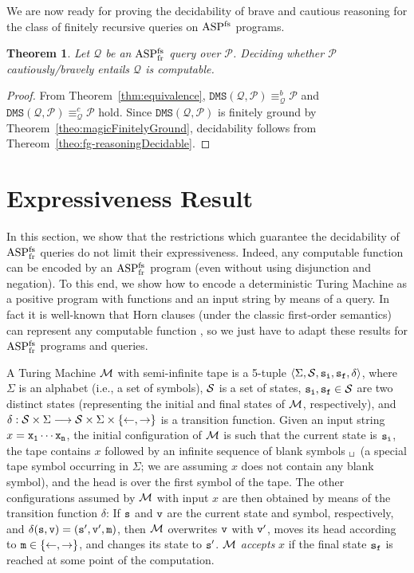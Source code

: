 \documentclass{tlp}
\newcommand{\p}{\ensuremath{{\mathcal{P}}}}
\newcommand{\tuple}[1]{\langle#1\rangle}
\newtheorem{theorem}{Theorem}[section]
\newcommand{\Q}{\mathcal{Q}}
\newcommand{\qrelation}[3]{\ensuremath{{#1}_{#2}^{#3}}}
\newcommand{\qequiv}[2]{\ensuremath{\qrelation{\equiv}{#1}{#2}}}
\newcommand{\bqequiv}[1]{\ensuremath{\qequiv{#1}{b}}}
\newcommand{\cqequiv}[1]{\ensuremath{\qequiv{#1}{c}}}
\newcommand{\dmsqp}{\ensuremath{\DMS(\Q,\p)}}
\newcommand{\DMS}{\ensuremath{\mathtt{DMS}}}
\newcommand{\ASPFN}{\ensuremath{\rm ASP^{\rm fs}}}
\newcommand{\ASPFNFR}{\ensuremath{\rm ASP^{\rm fs}_{\rm fr}}}
\newcommand{\blank}{\ensuremath{{\empty}_\sqcup}}
\begin{document}
We are now ready for proving the decidability of brave and cautious reasoning
for the class of finitely recursive queries on \ASPFN{} programs.

\begin{theorem}\label{theo:decidability}
Let $\Q$ be an \ASPFNFR{} query over $\p$.
Deciding whether $\p$ cautiously/bravely entails $\Q$ is computable.
\end{theorem}
\begin{proof}
From Theorem~\ref{thm:equivalence}, 
$\dmsqp \bqequiv{\Q}\p$ and $\dmsqp \cqequiv{\Q} \p$ hold.
Since $\dmsqp$ is finitely ground by Theorem~\ref{theo:magicFinitelyGround},
decidability follows from Thereom~\ref{theo:fg-reasoningDecidable}.
\end{proof}


\section{Expressiveness Result}\label{sec:expressiveness}

In this section, we show that the restrictions which guarantee the
decidability of \ASPFNFR{} queries do not limit their expressiveness.
Indeed, any computable function can be encoded by an \ASPFNFR{}
program (even without using disjunction and negation).  To this end,
we show how to encode a deterministic Turing Machine as a positive
program with functions and an input string by means of a query.  In
fact it is well-known that Horn clauses (under the classic first-order
semantics) can represent any computable function \cite{tarn-77}, so we
just have to adapt these results for \ASPFNFR{} programs and queries.


A Turing Machine ${\cal M}$ with semi-infinite tape 
is a 5-tuple $\tuple{\Sigma, {\cal S}, {\tt s_i}, {\tt s_f}, \delta}$,
where $\Sigma$ is an alphabet (i.e., a set of symbols),
$\cal S$ is a set of states,
${\tt s_i}, {\tt s_f} \in \cal S$ are two distinct states (representing the initial and 
final states of $\cal M$, respectively), and
$\delta : {\cal S} \times \Sigma \longrightarrow {\cal S} \times \Sigma \times \{\leftarrow, \rightarrow\}$ 
is a transition function.
Given an input string $x = \tt x_1 \cdots x_n$, the initial configuration of $\cal M$
is such that the current state is $\tt s_i$,
the tape contains $x$ followed by an infinite sequence of blank symbols $\blank$
(a special tape symbol occurring in $\Sigma$; we are assuming $x$ does not contain
any blank symbol), 
and the head is over the first symbol of the tape.
The other configurations assumed by $\cal M$ with input $x$ are then obtained by means 
of the transition function $\delta$:
If $\tt s$ and $\tt v$ are the current state and symbol, respectively,
and $\tt \delta(s,v) = (s',v',m)$, then $\cal M$ overwrites $\tt v$ with $\tt v'$,
moves its head according to ${\tt m} \in \{\leftarrow, \rightarrow\}$,
and changes its state to $\tt s'$.
$\cal M$ {\em accepts} $x$ if the final state $\tt s_f$ is reached
at some point of the computation.
\end{document}
